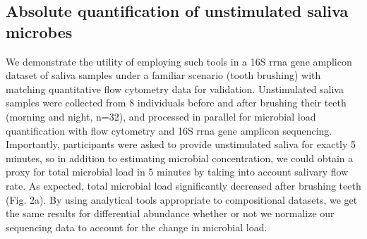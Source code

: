 \subsection{Absolute quantification of unstimulated saliva microbes}
%
We demonstrate the utility of employing such tools in a 16S \gls{rrna} gene amplicon dataset of saliva samples
under a familiar scenario (tooth brushing) with matching quantitative flow cytometry data for validation.
Unstimulated saliva samples were collected from 8 individuals before and after brushing their teeth
(morning and night, n=32), and processed in parallel for microbial load quantification with flow cytometry
and 16S \gls{rrna} gene amplicon sequencing. Importantly, participants were asked to provide unstimulated saliva
for exactly 5 minutes, so in addition to estimating microbial concentration, we could obtain a proxy for
total microbial load in 5 minutes by taking into account salivary flow rate. As expected, total microbial
load significantly decreased after brushing teeth (Fig. 2a). By using analytical tools appropriate to
compositional datasets, we get the same results for differential abundance whether or not we normalize
our sequencing data to account for the change in microbial load. \\[5 mm]
